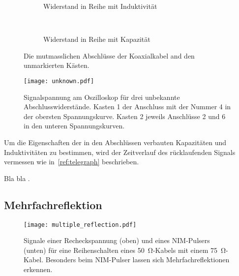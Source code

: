 \begin{figure}
    \centering
    \begin{subfigure}[b]{0.45\textwidth}
        
        \caption{Widerstand in Reihe mit Induktivität}
        \label{fig:end_1}
    \end{subfigure}
    ~ %
    \begin{subfigure}[b]{0.45\textwidth}
        
        \caption{Widerstand in Reihe mit Kapazität}
        \label{fig:end_2}
    \end{subfigure}
    \caption{Die mutmasslichen Abschlüsse der Koaxialkabel and den unmarkierten Kästen.}\label{fig:ends}
\end{figure}


\begin{figure}
  \centering
  \texttt{[image: unknown.pdf]}
  \caption{%
    Signalspannung am Oszilloskop für drei unbekannte Abschlusswiderstände.
    Kasten 1 der Anschluss mit der Nummer 4 in der obersten Spannungskurve. Kasten 2 jeweils Anschlüsse 2 und 6 in den
    unteren Spannungskurven.
  }\label{fig:unknown}
\end{figure}


Um die Eigenschaften der in den Abschlüssen verbauten Kapazitäten und Induktivitäten zu bestimmen, wird der Zeitverlauf des rücklaufenden Signals vermessen wie in~\ref{ref:telegraph} beschrieben.

Bla bla $$.

\subsection{Mehrfachreflektion}

\begin{figure}
  \centering
  \texttt{[image: multiple\_reflection.pdf]}
  \caption{%
    Signale einer Recheckspannung (oben) und eines NIM-Pulsers (unten) für eine Reihenschalten eines \SI{50}{\ohm}-Kabels mit einem \SI{75}{\ohm}-Kabel.
    Besonders beim NIM-Pulser lassen sich Mehrfachreflektionen erkennen.
  }\label{fig:multiple_reflection}
\end{figure}

